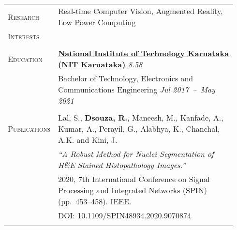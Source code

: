 \documentclass[letterpaper, 10pt, oneside]{article}
\newcommand{\stitle}[1]{\normalsize{\textsc{#1}}}
\begin{document}
\noindent \begin{longtable}{@{} p{0.14\linewidth} p{0.8\linewidth}}

    \stitle{Research}     & Real-time Computer Vision, Augmented Reality, Low Power Computing                                                        \\
    \stitle{Interests}    &                                                                                                                          \\
    \\


    \stitle{Education}    & \textbf{\href{https://nitk.ac.in}{National Institute of Technology Karnataka (NIT Karnataka)}} \hfill \textsl{8.58}      \\
                          & Bachelor of Technology, Electronics and Communications Engineering \hfill \hspace{-3em} \textsl{Jul 2017\ --\ May 2021}  \\
    \\


    \stitle{Publications} & Lal, S., \textbf{Dsouza, R.}, Maneesh, M., Kanfade, A., Kumar, A., Perayil, G., Alabhya, K., Chanchal, A.K. and Kini, J. \\
                          & \textsl{``A Robust Method for Nuclei Segmentation of H\&E Stained Histopathology Images.''}                              \\
                          & 2020, 7th International Conference on Signal Processing and Integrated Networks (SPIN) (pp.~453--458)\@. IEEE\@.         \\
                          & \textcolor{dark-purple}{DOI\@: 10.1109/SPIN48934.2020.9070874}                                                           \\
    \\



\end{longtable}
\end{document}
